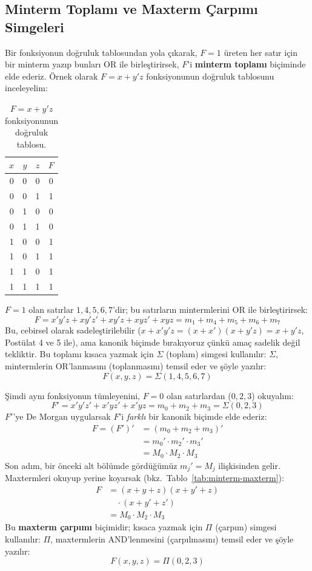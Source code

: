 \subsection{Minterm Toplamı ve Maxterm Çarpımı Simgeleri}
\label{sec:sigma-pi}

Bir fonksiyonun doğruluk tablosundan yola çıkarak, $F=1$ üreten her satır için bir
minterm yazıp bunları OR ile birleştirirsek, $F$'i \textbf{minterm toplamı} biçiminde
elde ederiz. Örnek olarak $F=x+y'z$ fonksiyonunun doğruluk tablosunu inceleyelim:

\begin{table}[H]
\centering
\begin{tabular}{ccc|c}
\toprule
$x$&$y$&$z$&$F$\\
\midrule
0&0&0&0\\
0&0&1&1\\
0&1&0&0\\
0&1&1&0\\
1&0&0&1\\
1&0&1&1\\
1&1&0&1\\
1&1&1&1\\
\bottomrule
\end{tabular}
\caption{$F=x+y'z$ fonksiyonunun doğruluk tablosu.}
\label{tab:sigma-pi-ornek}
\end{table}

$F=1$ olan satırlar $1,4,5,6,7$'dir; bu satırların mintermlerini OR ile birleştirirsek:
\[
F=x'y'z+xy'z'+xy'z+xyz'+xyz=m_1+m_4+m_5+m_6+m_7
\]
Bu, cebirsel olarak sadeleştirilebilir ($x+x'y'z=(x+x')(x+y'z)=x+y'z$, Postülat 4 ve 5
ile), ama kanonik biçimde bırakıyoruz çünkü amaç sadelik değil tekliktir. Bu toplamı kısaca yazmak için $\Sigma$ (toplam) simgesi kullanılır: $\Sigma$,
mintermlerin OR'lanmasını (toplanmasını) temsil eder ve şöyle yazılır:
\[
F(x,y,z)=\Sigma(1,4,5,6,7)
\]

Şimdi aynı fonksiyonun tümleyenini, $F=0$ olan satırlardan ($0,2,3$) okuyalım:
\[
F'=x'y'z'+x'yz'+x'yz=m_0+m_2+m_3=\Sigma(0,2,3)
\]
$F'$'ye De Morgan uygularsak $F$'i \emph{farklı} bir kanonik biçimde elde ederiz:
\begin{align*}
F=(F')'&=(m_0+m_2+m_3)'\\
       &=m_0'\cdot m_2'\cdot m_3'\\
       &=M_0\cdot M_2\cdot M_3
\end{align*}
Son adım, bir önceki alt bölümde gördüğümüz $m_j'=M_j$ ilişkisinden gelir. Maxtermleri
okuyup yerine koyarsak (bkz.~Tablo~\ref{tab:minterm-maxterm}):
\begin{align*}
F&=(x+y+z)(x+y'+z)\\
&\quad\cdot(x+y'+z')\\
&=M_0\cdot M_2\cdot M_3
\end{align*}
Bu \textbf{maxterm çarpımı} biçimidir; kısaca yazmak için $\Pi$ (çarpım) simgesi
kullanılır: $\Pi$, maxtermlerin AND'lenmesini (çarpılmasını) temsil eder ve şöyle
yazılır:
\[
F(x,y,z)=\Pi(0,2,3)
\]

